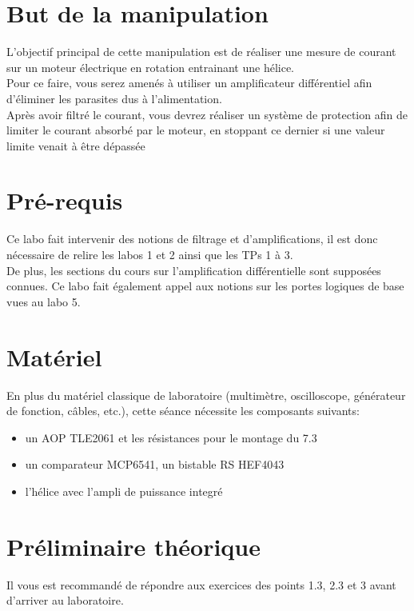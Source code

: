 \documentclass{../template/labo}
\author{The Fantastic Four} %
\begin{document}

\section{But de la manipulation}

L'objectif principal de cette manipulation est de réaliser une mesure de courant sur un moteur
électrique en rotation entrainant une hélice.\\
Pour ce faire, vous serez amenés à utiliser un amplificateur différentiel afin d'éliminer les parasites
dus à l'alimentation.\\
Après avoir filtré le courant, vous devrez réaliser un système de protection afin de limiter le courant
absorbé par le moteur, en stoppant ce dernier si une valeur limite venait à être dépassée

\section{Pré-requis}
Ce labo fait intervenir des notions de filtrage et d'amplifications, il est donc nécessaire de relire les
labos 1 et 2 ainsi que les TPs 1 à 3.\\
De plus, les sections du cours sur l'amplification différentielle sont supposées connues. Ce labo fait
également appel aux notions sur les portes logiques de base vues au labo 5.

\section{Matériel}
En plus du matériel classique de laboratoire (multimètre, oscilloscope, générateur de fonction, câbles, etc.), cette séance nécessite les composants suivants:
\begin{itemize}
\item un AOP TLE2061 et les résistances pour le montage du 7.3
\item un comparateur MCP6541, un bistable RS HEF4043
\item l'hélice avec l'ampli de puissance integré
\end{itemize}

\newpage
\section{Préliminaire théorique} %
Il vous est recommandé de répondre aux exercices des points 1.3, 2.3 et 3 avant d'arriver au
laboratoire.
\end{document}
